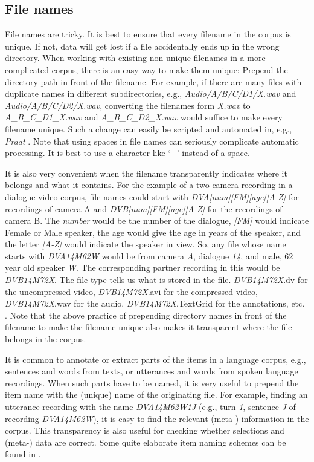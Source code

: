 \documentclass[10pt, a4paper]{article}
\begin{document}
\subsection{File names}

File names are tricky. It is best to ensure that every filename in the corpus is unique. If not, data will get lost if a file accidentally ends up in the wrong directory. When working with existing non-unique filenames in a more complicated corpus, there is an easy way to make them unique: Prepend the directory path in front of the filename. For example, if there are many files with duplicate names in different subdirectories, e.g., \emph{Audio/A/B/C/D1/X.wav} and \emph{Audio/A/B/C/D2/X.wav}, converting the filenames form \emph{X.wav} to \emph{A\_B\_C\_D1\_X.wav} and  \emph{A\_B\_C\_D2\_X.wav} would suffice to make every filename unique. Such a change can easily be scripted and automated in, e.g., \emph{Praat} \cite{Praat}. Note that using spaces in file names can seriously complicate automatic processing. It is best to use a character like `\_' instead of a space.

It is also very convenient when the filename transparently indicates where it belongs and what it contains. For the example of a two camera recording in a dialogue video corpus, file names could start with \emph{DVA[num][FM][age][A-Z]} for recordings of camera A and \emph{DVB[num][FM][age][A-Z]} for the recordings of camera B. The \emph{number} would be the number of the dialogue, \emph{[FM]} would indicate Female or Male speaker, the age would give the age in years of the speaker, and the letter \emph{[A-Z]} would indicate the speaker in view. So, any file whose name starts with \emph{DVA14M62W} would be from camera \emph{A}, dialogue \emph{14}, and male, 62 year old speaker \emph{W}. The corresponding partner recording in this would be \emph{DVB14M72X}. The file type tells us what is stored in the file. \emph{DVB14M72X}.dv for the uncompressed video, \emph{DVB14M72X}.avi for the compressed video, \emph{DVB14M72X}.wav for the audio. \emph{DVB14M72X}.TextGrid for the annotations, etc. \cite{vanSon2008ifadv,VanSon2009Prom}. Note that the above practice of prepending directory names in front of the filename to make the filename unique also makes it transparent where the file belongs in the corpus. 

It is common to annotate or extract parts of the items in a language corpus, e.g., sentences and words from texts, or utterances and words from spoken language recordings. When such parts have to be named, it is very useful to prepend the item name with the (unique) name of the originating file. For example, finding an utterance recording with the name \emph{DVA14M62W1J} (e.g., turn \emph{1}, sentence \emph{J} of recording \emph{DVA14M62W}), it is easy to find the relevant (meta-) information in the corpus. This transparency is also useful for checking whether selections and (meta-) data are correct. Some quite elaborate item naming schemes can be found in \cite{VanSonetal2001,vanSon2008ifadv,VanSon2009Prom}.
\end{document}
